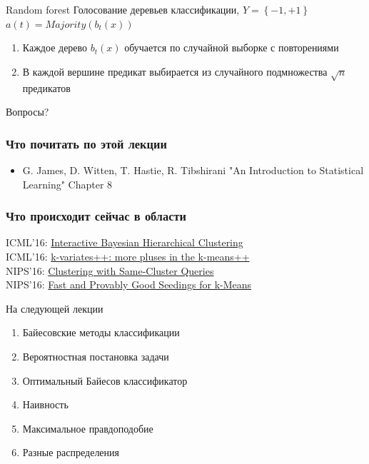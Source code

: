 \documentclass[10pt]{beamer}
\begin{document}
\begin{frame}{Random forest}
	Голосование деревьев классификации, $Y = \left\{ -1, +1 \right\}$\\
	$a(t) = Majority(b_t(x))$%
	\begin{enumerate}[--]
  	  \item Каждое дерево $b_t(x)$ обучается по случайной выборке с повторениями
	  \item В каждой вершине предикат выбирается из случайного подмножества $\sqrt{n}$ предикатов
	\end{enumerate}
\end{frame}

\begin{frame}[standout]
  Вопросы?
\end{frame}

\appendix

\begin{frame}\frametitle{Что почитать по этой лекции}
  \begin{itemize}
    \item G. James, D. Witten, T. Hastie, R. Tibshirani "An Introduction to Statistical Learning" Chapter 8
  \end{itemize}
\end{frame}

\begin{frame}\frametitle{Что происходит сейчас в области}
  ICML'16: \href{https://arxiv.org/pdf/1602.03258.pdf}{Interactive Bayesian Hierarchical Clustering}\\
  \bigbreak
  ICML'16: \href{https://arxiv.org/pdf/1602.01198.pdf}{k-variates++: more pluses in the k-means++}\\
  \bigbreak
  NIPS'16: \href{https://arxiv.org/pdf/1606.02404}{Clustering with Same-Cluster Queries}\\
  \bigbreak
  NIPS'16: \href{https://las.inf.ethz.ch/files/bachem16fast.pdf}{Fast and Provably Good Seedings for k-Means}\\
\end{frame}

\begin{frame}{На следующей лекции}
  	\begin{enumerate} [--]
		\item Байесовские методы классификации
		\item Вероятностная постановка задачи
		\item Оптимальный Байесов классификатор
		\item Наивность
		\item Максимальное правдоподобие
		\item Разные распределения
	\end{enumerate}
\end{frame}
\end{document}
